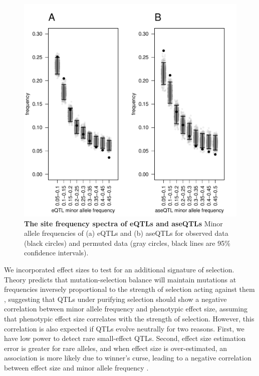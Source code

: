 \begin{figure}[ht!]
      \centering
       \includegraphics[width=\linewidth]{Ch3Fig3}
    \caption{\textbf{The site frequency spectra of eQTLs and aseQTLs} Minor allele frequencies of (a) eQTLs and (b) aseQTLs for observed data (black circles) and permuted data (gray circles, black lines are 95\% confidence intervals).}
    \label{fig:3fig3}
\end{figure}

We incorporated effect sizes to test for an additional signature of selection. Theory predicts that mutation-selection balance will maintain mutations at frequencies inversely proportional to the strength of selection acting against them \citep{Haldane1927-pj}, suggesting that QTLs under purifying selection should show a negative correlation between minor allele frequency and phenotypic effect size, assuming that phenotypic effect size correlates with the strength of selection. However, this correlation is also expected if QTLs evolve neutrally for two reasons. First, we have low power to detect rare small-effect QTLs. Second, effect size estimation error is greater for rare alleles, and when effect size is over-estimated, an association is more likely due to winner’s curse, leading to a negative correlation between effect size and minor allele frequency \citep{Capen1971-bs}. 

